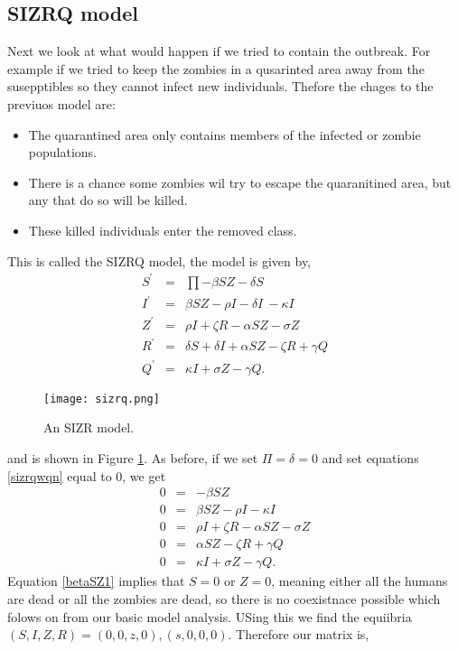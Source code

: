 \documentclass{mm2}
\numberwithin{equation}{section}
\theoremstyle{definition}
\begin{document}
\subsection{SIZRQ model}
Next we look at what would happen if we tried to contain the outbreak. For example if we tried to keep the zombies in a qusarinted area away from the susepptibles so they cannot infect new individuals. Thefore the chages to the previuos model are:
\begin{itemize}
	\item The quarantined area only contains members of the infected or zombie populations.
	\item There is a chance some zombies wil try to escape the quaranitined area, but any that do so will be killed. 
	\item These killed individuals enter the removed class.
\end{itemize}
This is called the SIZRQ model, the model is given by,
\begin{eqnarray}
S^{'} &=& \prod - \beta SZ - \delta S \nonumber \\
I^{'} &=& \beta SZ- \rho I - \delta I\ -\kappa I \nonumber \\ 
Z^{'} &=& \rho I + \zeta R - \alpha SZ - \sigma Z \nonumber \\
R^{'} &=& \delta S + \delta I + \alpha SZ - \zeta R + \gamma Q \nonumber \\
Q^{'} &=& \kappa I + \sigma Z - \gamma Q.
\label{sizrqeqn}
\end{eqnarray}
\begin{figure}[ht]
	\centering
	\texttt{[image: sizrq.png]}
	\caption{An SIZR model.}
	\label{sizrq}
\end{figure}\newline
and is shown in Figure \ref{sizrq}.
As before, if we set $\Pi = \delta = 0$ and set equations \ref{sizrqwqn} equal to 0, we get
\begin{eqnarray}
0 &=& - \beta SZ \label{betaSZ1}\\
0 &=& \beta SZ- \rho I -\kappa I \\ 
0 &=& \rho I + \zeta R - \alpha SZ -\sigma Z \\
0 &=& \alpha SZ - \zeta R + \gamma Q\\
0 &=& \kappa I + \sigma Z - \gamma Q.
\label{sizrqeqn2}
\end{eqnarray}
Equation \ref{betaSZ1} implies that $S=0$ or $Z=0$, meaning either all the humans are dead or all the zombies are dead, so there is no coexistnace possible which folows on from our basic model analysis. USing this we find the equiibria $(S, I, Z, R) = (0, 0, z, 0), (s, 0, 0, 0)$. Therefore our matrix is,
\end{document}
